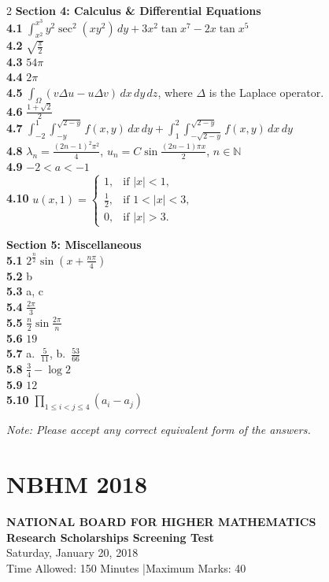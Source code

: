 \documentclass[11pt,a4paper]{article}
\newcommand{\N}{\mathbb{N}}
\newcommand{\examheader}[4]{%
  \clearpage
  \section{#1}
  \begin{center}
    {\large\bfseries NATIONAL BOARD FOR HIGHER MATHEMATICS}\\[3pt]
    {\bfseries #2}\\[2pt]
    {#3}\\[2pt]
    {\small #4}
  \end{center}
  \vspace{4pt}
}
\begin{document}
\begin{multicols}{2}
\medskip
\textbf{Section 4: Calculus \& Differential Equations}\\
\textbf{4.1} $\int_{x^2}^{x^3} y^2\sec^2(xy^2)\,dy + 3x^2\tan x^7 - 2x\tan x^5$\\
\textbf{4.2} $\sqrt{\frac{\pi}{2}}$\\
\textbf{4.3} $54\pi$\\
\textbf{4.4} $2\pi$\\
\textbf{4.5} $\int_\Omega (v\Delta u - u\Delta v)\,dx\,dy\,dz$, where $\Delta$ is the Laplace operator.\\
\textbf{4.6} $\frac{1+\sqrt{2}}{2}$\\
\textbf{4.7} $\int_{-2}^{1}\int_{-y}^{\sqrt{2-y}} f(x, y)\,dx\,dy + \int_{1}^{2}\int_{-\sqrt{2-y}}^{\sqrt{2-y}} f(x, y)\,dx\,dy$\\
\textbf{4.8} $\lambda_n = \frac{(2n-1)^2\pi^2}{4}$, $u_n = C\sin\frac{(2n-1)\pi x}{2}$, $n \in \N$\\
\textbf{4.9} $-2 < a < -1$\\
\textbf{4.10} $u(x, 1) = \begin{cases} 1, & \text{if } |x| < 1, \\ \frac{1}{2}, & \text{if } 1 < |x| < 3, \\ 0, & \text{if } |x| > 3. \end{cases}$

\medskip
\textbf{Section 5: Miscellaneous}\\
\textbf{5.1} $2^{\frac{n}{2}}\sin\left(x + \frac{n\pi}{4}\right)$\\
\textbf{5.2} b\\
\textbf{5.3} a, c\\
\textbf{5.4} $\frac{2\pi}{3}$\\
\textbf{5.5} $\frac{n}{2}\sin\frac{2\pi}{n}$\\
\textbf{5.6} $19$\\
\textbf{5.7} a.\ $\frac{5}{11}$, b.\ $\frac{53}{66}$\\
\textbf{5.8} $\frac{3}{4} - \log 2$\\
\textbf{5.9} $12$\\
\textbf{5.10} $\prod_{1 \le i < j \le 4} (a_i - a_j)$

\medskip
\noindent\emph{Note: Please accept any correct equivalent form of the answers.}
\end{multicols}
\examheader{NBHM 2018}{Research Scholarships Screening Test}{Saturday, January 20, 2018}{Time Allowed: 150 Minutes \quad|\quad Maximum Marks: 40}
\end{document}
